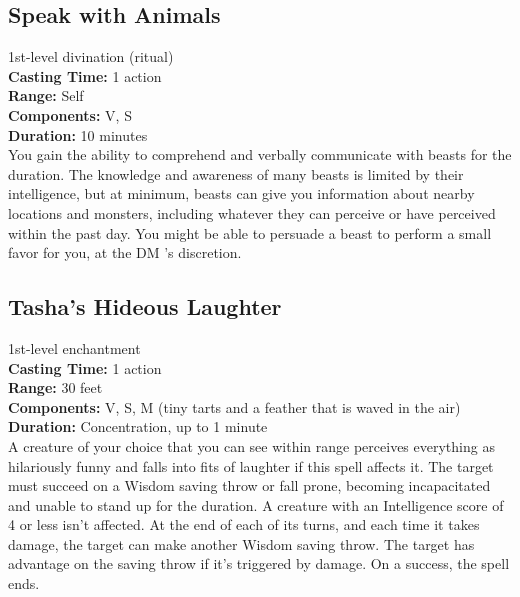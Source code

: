 \documentclass[11pt, A4paper, english]{article}
\begin{document}
		\subsection{Speak with Animals}
1st-level divination (ritual) \\
\textbf{Casting Time:} 1 action \\
\textbf{Range:} Self \\
\textbf{Components:} V, S \\
\textbf{Duration:} 10 minutes \\
You gain the ability to comprehend and verbally communicate with beasts for the duration. The knowledge and awareness of many beasts is limited by their intelligence, but at minimum, beasts can give you information about nearby locations and monsters, including whatever they can perceive or have perceived within the past day. You might be able to persuade a beast to perform a small favor for you, at the DM ’s discretion.

		\subsection{Tasha’s Hideous Laughter}
1st-level enchantment \\
\textbf{Casting Time:} 1 action \\
\textbf{Range:} 30 feet \\
\textbf{Components:} V, S, M (tiny tarts and a feather that is waved in the air) \\
\textbf{Duration:} Concentration, up to 1 minute \\
A creature of your choice that you can see within range perceives everything as hilariously funny and falls into fits of laughter if this spell affects it. The target must succeed on a Wisdom  saving throw or fall prone, becoming incapacitated and unable to stand up for the duration. A creature with an Intelligence score of 4 or less isn’t affected. At the end of each of its turns, and each time it takes damage, the target can make another Wisdom  saving throw. The target has advantage on the saving throw if it’s triggered by damage. On a success, the spell ends.
\end{document}
